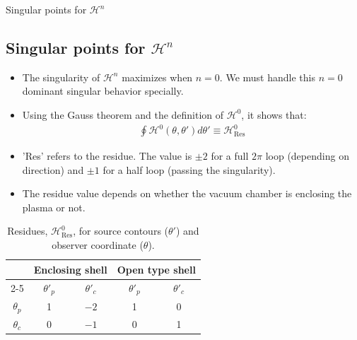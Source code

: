 \documentclass[8pt]{beamer}
\begin{document}
\begin{frame}{\color{white} Singular points for $\mathcal{H}^n$}
\subsection{Singular points for $\mathcal{H}^n$}
\begin{itemize}
    \item The singularity of $\mathcal{H}^n$ maximizes when $n=0$. We must handle this $n=0$ dominant singular behavior specially.
    \item Using the Gauss theorem and the definition of $\mathcal{H}^0$, it shows that:
    \begin{align}
         \oint \mathcal{H}^0 (\theta, \theta')d\theta' \equiv \mathcal{H}^0_{\text{Res}}
    \end{align}
    \item 'Res' refers to the residue. The value is $\pm 2$ for a full $2\pi$ loop (depending on direction) and $\pm 1$ for a half loop (passing the singularity).
    \item The residue value depends on whether the vacuum chamber is enclosing the plasma or not.
\end{itemize}
\begin{table}[h!]
\centering
\caption{Residues, $\mathcal{H}^0_{\text{Res}}$, for source contours ($\theta'$) and observer coordinate ($\theta$).}
\label{tab:residues}
\begin{tabular}{c c c c c}
\hline\hline
& \multicolumn{2}{c}{Enclosing shell} & \multicolumn{2}{c}{Open type shell} \\
\cline{2-5}
& $\theta'_{p}$ & $\theta'_{c}$ & $\theta'_{p}$ & $\theta'_{c}$ \\
\hline
$\theta_{p}$ & 1 & $-2$ & 1 & 0 \\
$\theta_{c}$ & 0 & $-1$ & 0 & 1 \\
\hline\hline
\end{tabular}
\end{table}
\end{frame}
\end{document}
